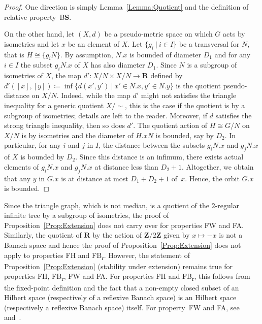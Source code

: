 \documentclass[a4paper]{article}
\theoremstyle{definition}
\newcommand*{\field}[1]{\mathbf{#1}}
\newcommand*{\Z}{\field{Z}}
\newcommand*{\R}{\field{R}}
\newcommand*{\BS}{B\textbf{S}}
\newcommand*{\FB}{FB\textsubscript{r}}
\newcommand*{\FH}{FH}
\newcommand*{\FW}{FW}
\newcommand*{\FA}{FA}
\newcommand{\setst}[2]{\{#1\ |\ #2\}}
\begin{document}
\begin{proof}
One direction is simply Lemma~\ref{Lemma:Quotient} and the definition of relative property~\BS.

On the other hand, let $(X,d)$ be a pseudo-metric space on which $G$ acts %
by isometries and let $x$ be an element of $X$.
Let $\setst{g_i}{i\in I}$ be a transversal for $N$, that is $H\cong\{g_iN\}$.
By assumption, $N.x$ is bounded of diameter $D_1$ and for any $i\in I$ the subset $g_iN.x$ of $X$ has also diameter $D_1$.
Since $N$ is a subgroup of isometries of $X$, the map $d'\colon X/N\times X/N\to\R$ defined by $d'([x],[y])\coloneqq\inf\setst{d(x',y')}{x'\in N.x,y'\in N.y}$ is the quotient pseudo-distance on $X/N$.
Indeed, while the map $d'$ might not satisfies the triangle inequality for a generic quotient $X/\sim$, this is the case if the quotient is by a subgroup of isometries; details are left to the reader.
Moreover, if $d$ satisfies the strong triangle inequality, then so does $d'$.
The quotient action of $H\cong G/N$ on $X/N$ is %
by isometries and the diameter of $H.xN$ is bounded, say by $D_2$.
In particular, for any $i$ and $j$ in $I$, the distance between the subsets $g_iN.x$ and $g_jN.x$ of $X$ is bounded by $D_2$.
Since this distance is an infimum, there exists actual elements of $g_iN.x$ and $g_jN.x$ at distance less than $D_2+1$.
Altogether, we obtain that any $y$ in $G.x$ is at distance at most $D_1+D_2+1$ of~$x$.
Hence, the orbit $G.x$ is bounded.
\end{proof}
%
%
Since the triangle graph, which is not median, is a quotient of the $2$-regular infinite tree by a subgroup of isometries, the proof of Proposition~\ref{Prop:Extension} does not carry over for properties \FW{} and \FA.
Similarly, the quotient of $\R$ by the action of $\Z/2\Z$ given by $x\mapsto-x$ is not a Banach space and hence the proof of Proposition~\ref{Prop:Extension} does not apply to properties \FH{} and \FB.
However, the statement of Proposition~\ref{Prop:Extension} (stability under extension) remains true for properties \FH, \FB, \FW{} and \FA.
For properties \FH{} and \FB, this follows from the fixed-point definition and the fact that a non-empty closed subset of an Hilbert space (respectively of a reflexive Banach space) is an Hilbert space (respectively a reflexive Banach space) itself.
For property~\FW{} and \FA, see~\cite{Cornulier2013} and~\cite{MR0476875}.
\end{document}
